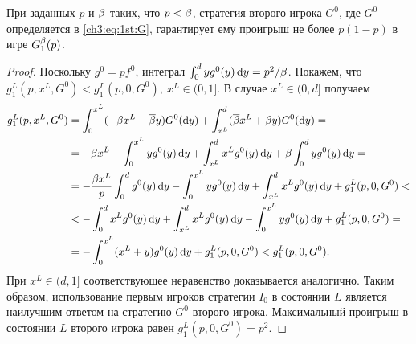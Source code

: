 {\begin{lemma}
  \label{ch3:lem:1st:upper-bound}
  При заданных $p$ и $\beta$ таких, что $p < \beta$, стратегия второго игрока $G^0$, где $G^0$ определяется в \eqref{ch3:eq:1st:G}, гарантирует ему проигрыш не более $p(1-p)$ в игре $G^{\beta}_1(p)$.
\end{lemma}
\begin{proof}
  Поскольку $g^0 = p f^0$, интеграл $\int_0^d y g^0(y) \mathop{}\!\mathrm{d} y = p^2/\beta$.
  Покажем, что $g^L_1(p, x^L, G^0) < g^L_1(p, 0, G^0),\ x^L \in (0, 1]$.
  В случае $x^L \in (0, d]$ получаем
  \begin{align*}
    g^L_1(p, x^L, G^0)
    &= \int_0^{x^L} (-\Co x^L - \DCo y) G^0(\di y) + \int_{x^L}^d(\DCo x^L + \Co y) G^0(\di y) = \\
    &= - \Co x^L - \int_0^{x^L} y g^0(y) \di y + \int_{x^L}^d x^L g^0(y) \di y + \Co \int_0^d y g^0(y) \di y = \\
    &= - \frac{\Co x^L}{p} \int_0^d g^0(y) \di y - \int_0^{x^L} y g^0(y) \di y + \int_{x^L}^d x^L g^0(y) \di y + g^L_1(p, 0, G^0) < \\
    &< -\int_0^d x^L g^0(y) \di y + \int_{x^L}^d x^L g^0(y) \di y - \int_0^{x^L} y g^0(y) \di y + g^L_1(p, 0, G^0) = \\
    &= - \int_0^{x^L} (x^L + y) g^0(y) \di y + g^L_1(p, 0, G^0) < g^L_1(p, 0, G^0).
  \end{align*}
  При $x^L \in (d, 1]$ соответствующее неравенство доказывается аналогично.
  Таким образом, использование первым игроков стратегии $I_0$ в состоянии $L$ является наилучшим ответом на стратегию $G^0$ второго игрока.
  Максимальный проигрыш в состоянии $L$ второго игрока равен $g^L_1(p, 0, G^0) = p^2$.
  

\end{proof}}
